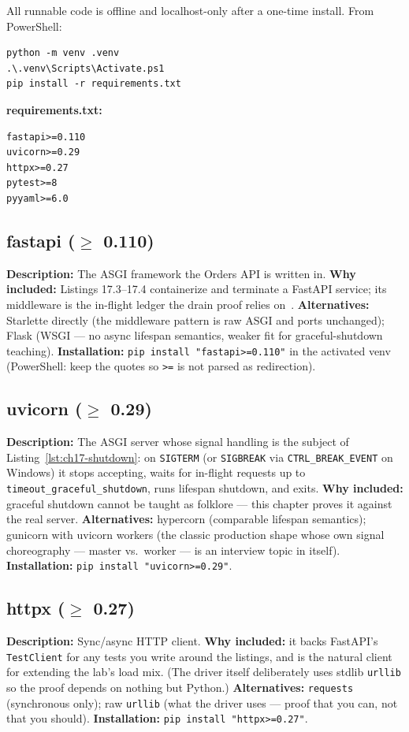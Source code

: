 All runnable code is offline and localhost-only after a one-time install.
From PowerShell:

\begin{verbatim}
python -m venv .venv
.\.venv\Scripts\Activate.ps1
pip install -r requirements.txt
\end{verbatim}

\noindent\textbf{requirements.txt:}
\begin{verbatim}
fastapi>=0.110
uvicorn>=0.29
httpx>=0.27
pytest>=8
pyyaml>=6.0
\end{verbatim}

\subsection{fastapi ($\geq$ 0.110)}
\textbf{Description:} The ASGI framework the Orders API is written in.
\textbf{Why included:} Listings 17.3--17.4 containerize and terminate a
FastAPI service; its middleware is the in-flight ledger the drain proof
relies on~\cite{fastapidocs}. \textbf{Alternatives:} Starlette directly
(the middleware pattern is raw ASGI and ports unchanged); Flask (WSGI ---
no async lifespan semantics, weaker fit for graceful-shutdown teaching).
\textbf{Installation:} \texttt{pip install "fastapi>=0.110"} in the
activated venv (PowerShell: keep the quotes so \texttt{>=} is not parsed
as redirection).

\subsection{uvicorn ($\geq$ 0.29)}
\textbf{Description:} The ASGI server whose signal handling is the
subject of Listing~\ref{lst:ch17-shutdown}: on \texttt{SIGTERM} (or
\texttt{SIGBREAK} via \texttt{CTRL\_BREAK\_EVENT} on Windows) it stops
accepting, waits for in-flight requests up to
\texttt{timeout\_graceful\_shutdown}, runs lifespan shutdown, and exits.
\textbf{Why included:} graceful shutdown cannot be taught as folklore ---
this chapter proves it against the real server. \textbf{Alternatives:}
hypercorn (comparable lifespan semantics); gunicorn with uvicorn workers
(the classic production shape whose own signal choreography --- master
vs.\ worker --- is an interview topic in itself).
\textbf{Installation:} \texttt{pip install "uvicorn>=0.29"}.

\subsection{httpx ($\geq$ 0.27)}
\textbf{Description:} Sync/async HTTP client. \textbf{Why included:} it
backs FastAPI's \texttt{TestClient} for any tests you write around the
listings, and is the natural client for extending the lab's load mix.
(The driver itself deliberately uses stdlib \texttt{urllib} so the proof
depends on nothing but Python.) \textbf{Alternatives:} \texttt{requests}
(synchronous only); raw \texttt{urllib} (what the driver uses --- proof
that you can, not that you should). \textbf{Installation:}
\texttt{pip install "httpx>=0.27"}.

